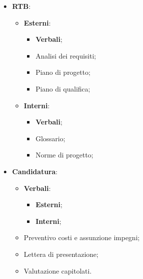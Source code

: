 \documentclass[8pt]{article}
\begin{document}
 \begin{itemize}
    \item \textbf{RTB}:
    \begin{itemize}
        \item \textbf{Esterni}:
        \begin{itemize}
            \item \textbf{Verbali};
            \item Analisi dei requisiti;
            \item Piano di progetto;
            \item Piano di qualifica;
        \end{itemize}
        \item \textbf{Interni}:
        \begin{itemize}
            \item \textbf{Verbali};
            \item Glossario;
            \item Norme di progetto;
        \end{itemize}
    \end{itemize}
    \item \textbf{Candidatura}:
    \begin{itemize}
        \item \textbf{Verbali}:
        \begin{itemize}
            \item \textbf{Esterni};
            \item \textbf{Interni};
        \end{itemize}
        \item Preventivo costi e assunzione impegni;
        \item Lettera di presentazione;
        \item Valutazione capitolati.
    \end{itemize}
 \end{itemize}
\end{document}

